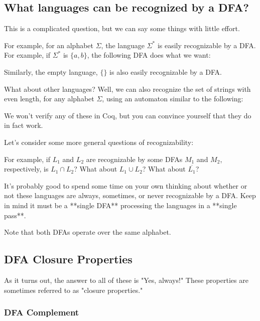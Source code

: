 \subsection{What languages can be recognized by a DFA?}

This is a complicated question, but we can say some things with little effort.

For example, for an alphabet $\Sigma$, the language $\Sigma^*$ is easily recognizable by a DFA.
For example, if $\Sigma^*$ is $\{a, b\}$, the following DFA does what we want:



Similarly, the empty language, $\{\}$ is also easily recognizable by a DFA.

What about other languages?
Well, we can also recognize the set of strings with even length, for any alphabet $\Sigma$, using an automaton similar to the following:


We won't verify any of these in Coq, but you can convince yourself that they do in fact work.

Let's consider some more general questions of recognizability:

For example, if $L_1$ and $L_2$ are recognizable by some DFAs $M_1$ and $M_2$, respectively, is $L_1 \cap L_2$?
What about $L_1 \cup L_2$?
What about $\overline{L_1}$?

It's probably good to spend some time on your own thinking about whether or not these languages are always, sometimes, or never recognizable by a DFA.
Keep in mind it must be a **single DFA** processing the languages in a **single pass**.

Note that both DFAs operate over the same alphabet.

\subsection{DFA Closure Properties}

As it turns out, the answer to all of these is "Yes, always!"
These properties are sometimes referred to as "closure properties."

\subsubsection{DFA Complement}

